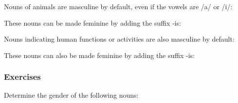 Nouns of animals are masculine by default, even if the vowels are /a/ or /i/:

These nouns can be made feminine by adding the suffix -is:

Nouns indicating human functions or activities are also masculine by default:

These nouns can also be made feminine by adding the suffix -is:

\subsubsection{Exercises}

Determine the gender of the following nouns:

